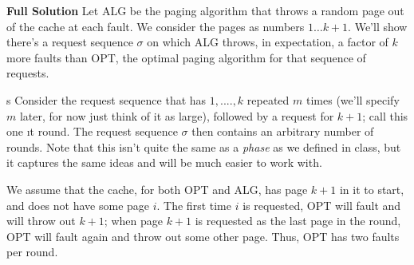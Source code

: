 \documentclass{article}
\newcommand{\E}[1]{\operatorname{E}\left[#1\right]}
\begin{document}



\textbf{Full Solution}
    Let ALG be the paging algorithm that throws a random page out of the cache at each fault. We consider the pages as numbers $1 \ldots k+1$. 
    We'll show there's a request sequence $\sigma$ on which ALG throws, in expectation, a factor of $k$ more faults than OPT, the optimal paging algorithm for that sequence of requests. 

    \vspace{3mm}s
    Consider the request sequence that has $1,....,k$ repeated $m$ times (we'll specify $m$ later, for now just think of it as large), followed by a request for $k+1$; call this one {\i  t round}. The request sequence $\sigma$ then contains an arbitrary number of rounds. Note that this isn't quite the same as a {\it phase} as we defined in class, but it captures the same ideas and will be much easier to work with. 

    \vspace{3mm}
    We assume that the cache, for both OPT and ALG, has page $k+1$ in it to start, and does not have some page $i$. The first time $i$ is requested, OPT will fault and will throw out $k+1$; when page $k+1$ is requested as the last page in the round, OPT will fault again and throw out some other page. Thus, OPT has two faults per round. 
\end{document}
